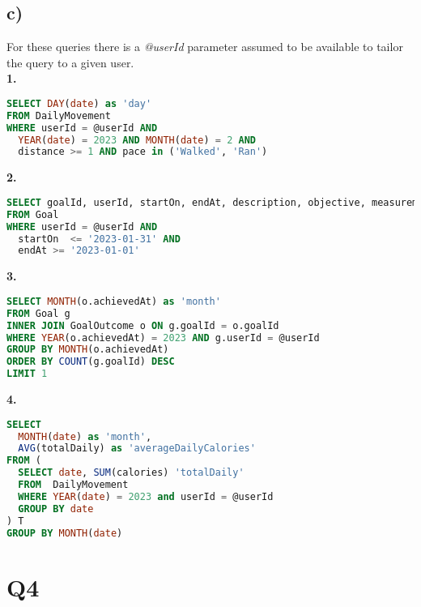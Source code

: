 \documentclass{article}
\begin{document}
\subsection*{\small c)}
For these queries there is a {\em @userId} parameter assumed to be available to tailor the query to a given user. \\
\newline
\textbf{\small{1.}}
\begin{lstlisting}[language=sql]
SELECT DAY(date) as 'day'
FROM DailyMovement 
WHERE userId = @userId AND 
  YEAR(date) = 2023 AND MONTH(date) = 2 AND 
  distance >= 1 AND pace in ('Walked', 'Ran')
\end{lstlisting}
\textbf{\small{2.}}
\begin{lstlisting}[language=sql]
SELECT goalId, userId, startOn, endAt, description, objective, measurement, target
FROM Goal 
WHERE userId = @userId AND 
  startOn  <= '2023-01-31' AND 
  endAt >= '2023-01-01'
\end{lstlisting}
\textbf{\small{3.}}
\begin{lstlisting}[language=sql]
SELECT MONTH(o.achievedAt) as 'month'
FROM Goal g
INNER JOIN GoalOutcome o ON g.goalId = o.goalId
WHERE YEAR(o.achievedAt) = 2023 AND g.userId = @userId
GROUP BY MONTH(o.achievedAt)
ORDER BY COUNT(g.goalId) DESC
LIMIT 1
\end{lstlisting}
\textbf{\small{4.}}
\begin{lstlisting}[language=sql]
SELECT 
  MONTH(date) as 'month', 
  AVG(totalDaily) as 'averageDailyCalories'
FROM (
  SELECT date, SUM(calories) 'totalDaily'
  FROM  DailyMovement 
  WHERE YEAR(date) = 2023 and userId = @userId
  GROUP BY date
) T
GROUP BY MONTH(date)
\end{lstlisting}

\pagebreak

\section*{Q4}
\end{document}
